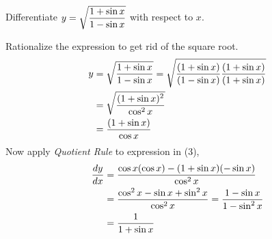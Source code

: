 

\question Differentiate $y=\sqrt{\dfrac{1+\sin x}{1-\sin x}}$ 
with respect to $x$.

\watchout

\begin{solution}
  Rationalize the expression to get rid of the square root.
  \begin{align}
    y&=\sqrt{\dfrac{1+\sin x}{1-\sin x}}
      =\sqrt{\dfrac{(1+\sin x)}{(1-\sin x)}
             \dfrac{(1+\sin x)}{(1+\sin x)}} \\
     &=\sqrt{\dfrac{(1+\sin x)^2}{\cos^2 x}} \\
     &=\dfrac{(1+\sin x)}{\cos x}
  \end{align}
  Now apply \textit{Quotient Rule} to expression in (3),
  \begin{align}
    \dfrac{dy}{dx}&=\dfrac{\cos x(\cos x)-(1+\sin x)(-\sin x)}
                          {\cos^2 x} \\
                  &=\dfrac{\cos^2 x -\sin x +\sin^2 x}{\cos^2 x}
                   =\dfrac{ 1-\sin x}{1-\sin^2 x} \\
                  &=\dfrac{ 1}{1+\sin x}
  \end{align}

\end{solution}
